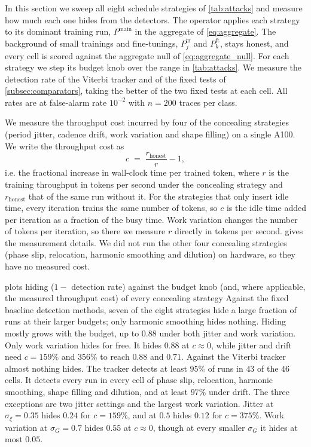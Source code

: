 \documentclass{article}
\begin{document}
In this section we sweep all eight schedule strategies of \cref{tab:attacks}
and measure how much each one hides from the detectors. The
operator applies each strategy to its dominant training run, $P^{\mathrm{main}}$
in the aggregate of \cref{eq:aggregate}. The background of small trainings and
fine-tunings, $P^{\mathrm{tr}}_j$ and $P^{\mathrm{ft}}_k$, stays honest, and every cell is scored against the aggregate null of
\cref{eq:aggregate_null}. For each strategy we step its budget knob over the
range in \cref{tab:attacks}. We measure the detection rate of the Viterbi tracker and of the
fixed tests of \cref{subsec:comparators}, taking the better of the two fixed
tests at each cell. All rates are at false-alarm rate $10^{-2}$ with $n=200$
traces per class.

We measure the throughput cost incurred by four of the concealing strategies (period jitter, cadence drift, work variation and shape filling) on a single A100. We write the throughput cost as
\begin{equation}
	c \;=\; \frac{r_{\mathrm{honest}}}{r} - 1,
	\label{eq:throughput_cost}
\end{equation}
i.e. the fractional increase in wall-clock time per trained token, where $r$ is the
training throughput in tokens per second under the concealing strategy and
$r_{\mathrm{honest}}$ that of the same run without it.
For the strategies that only insert idle time, every iteration trains the same
number of tokens, so $c$ is the idle time added per iteration as a fraction of
the busy time. Work variation changes the number of tokens per iteration, so
there we measure $r$ directly in tokens per second.  gives
the measurement details.
We did not run the other four concealing strategies (phase slip,
relocation, harmonic smoothing and dilution) on hardware, so they have no
measured cost. 



 plots hiding ($1-$ detection rate) against the
budget knob (and, where applicable, the measured throughput cost) of every concealing strategy Against the fixed baseline detection methods, seven of the eight strategies hide a large fraction of
runs at their larger budgets; only harmonic smoothing hides nothing. Hiding
mostly grows with the budget, up to $0.88$ under both jitter and work
variation. Only work variation hides for free. It hides $0.88$ at $c \approx 0$,
while jitter and drift need $c = 159\%$ and $356\%$ to reach $0.88$
and $0.71$. Against the Viterbi tracker almost nothing hides. The tracker detects at least
$95\%$ of runs in $43$ of the $46$ cells. It detects every run in every cell of
phase slip, relocation, harmonic smoothing, shape filling and dilution, and at
least $97\%$ under drift. The three exceptions are two jitter settings and the
largest work variation. Jitter at $\sigma_\xi = 0.35$ hides $0.24$
for $c = 159\%$, and at $0.5$ hides $0.12$ for $c = 375\%$. Work variation at $\sigma_G = 0.7$ hides $0.55$ at $c \approx 0$,
though at every smaller $\sigma_G$ it hides at most $0.05$.
\end{document}
